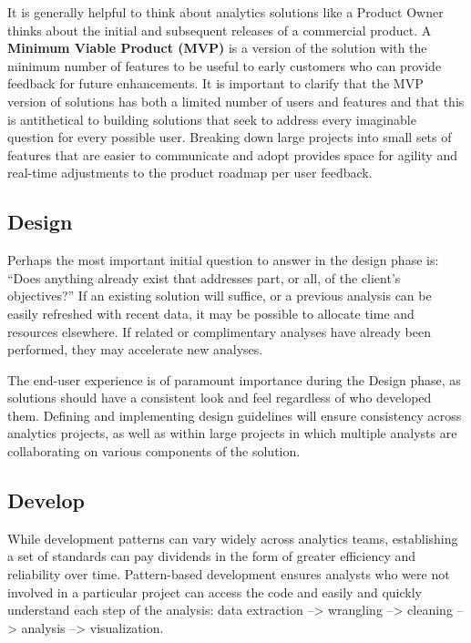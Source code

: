 \documentclass[]{book}
\begin{document}
It is generally helpful to think about analytics solutions like a Product Owner thinks about the initial and subsequent releases of a commercial product. A \textbf{Minimum Viable Product (MVP)} is a version of the solution with the minimum number of features to be useful to early customers who can provide feedback for future enhancements. It is important to clarify that the MVP version of solutions has both a limited number of users and features and that this is antithetical to building solutions that seek to address every imaginable question for every possible user. Breaking down large projects into small sets of features that are easier to communicate and adopt provides space for agility and real-time adjustments to the product roadmap per user feedback.

\hypertarget{design}{%
\subsection{Design}\label{design}}

Perhaps the most important initial question to answer in the design phase is: ``Does anything already exist that addresses part, or all, of the client's objectives?'' If an existing solution will suffice, or a previous analysis can be easily refreshed with recent data, it may be possible to allocate time and resources elsewhere. If related or complimentary analyses have already been performed, they may accelerate new analyses.

The end-user experience is of paramount importance during the Design phase, as solutions should have a consistent look and feel regardless of who developed them. Defining and implementing design guidelines will ensure consistency across analytics projects, as well as within large projects in which multiple analysts are collaborating on various components of the solution.

\hypertarget{develop}{%
\subsection{Develop}\label{develop}}

While development patterns can vary widely across analytics teams, establishing a set of standards can pay dividends in the form of greater efficiency and reliability over time. Pattern-based development ensures analysts who were not involved in a particular project can access the code and easily and quickly understand each step of the analysis: data extraction --\textgreater{} wrangling --\textgreater{} cleaning --\textgreater{} analysis --\textgreater{} visualization.
\end{document}
